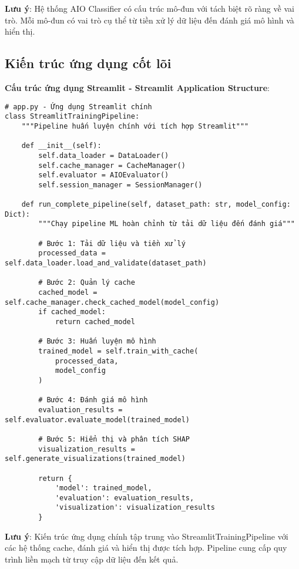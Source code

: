 \textbf{Lưu ý}: Hệ thống AIO Classifier có cấu trúc mô-đun với tách biệt rõ ràng về vai trò. Mỗi mô-đun có vai trò cụ thể từ tiền xử lý dữ liệu đến đánh giá mô hình và hiển thị.

\subsection{Kiến trúc ứng dụng cốt lõi}

\textbf{Cấu trúc ứng dụng Streamlit - Streamlit Application Structure}:

\begin{verbatim}
# app.py - Ứng dụng Streamlit chính
class StreamlitTrainingPipeline:
    """Pipeline huấn luyện chính với tích hợp Streamlit"""
    
    def __init__(self):
        self.data_loader = DataLoader()
        self.cache_manager = CacheManager()
        self.evaluator = AIOEvaluator()
        self.session_manager = SessionManager()
        
    def run_complete_pipeline(self, dataset_path: str, model_config: Dict):
        """Chạy pipeline ML hoàn chỉnh từ tải dữ liệu đến đánh giá"""
        
        # Bước 1: Tải dữ liệu và tiền xử lý
        processed_data = self.data_loader.load_and_validate(dataset_path)
        
        # Bước 2: Quản lý cache
        cached_model = self.cache_manager.check_cached_model(model_config)
        if cached_model:
            return cached_model
            
        # Bước 3: Huấn luyện mô hình
        trained_model = self.train_with_cache(
            processed_data, 
            model_config
        )
        
        # Bước 4: Đánh giá mô hình
        evaluation_results = self.evaluator.evaluate_model(trained_model)
        
        # Bước 5: Hiển thị và phân tích SHAP
        visualization_results = self.generate_visualizations(trained_model)
        
        return {
            'model': trained_model,
            'evaluation': evaluation_results,
            'visualization': visualization_results
        }
\end{verbatim}

\textbf{Lưu ý}: Kiến trúc ứng dụng chính tập trung vào StreamlitTrainingPipeline với các hệ thống cache, đánh giá và hiển thị được tích hợp. Pipeline cung cấp quy trình liền mạch từ truy cập dữ liệu đến kết quả.

